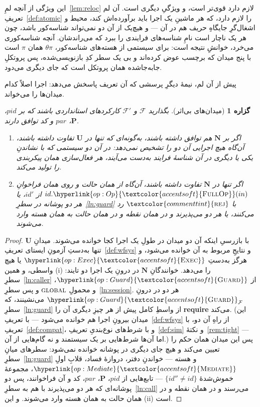 \documentclass[10pt,oneside,openany]{book}
\newcommand{\Ps}{\mathbf{P}}
\newcommand{\PID}{\mathit{pid}}
\newcommand{\admits}{\mathbf{N}}
\newcommand{\pars}{\mathit{par}}
\newcommand{\uses}{\mathbf{U}}
\newcommand{\F}{\mathcal{F}}
\newcommand{\op}[1]{\textnormal{\textsc{#1}}}
\newcommand{\opl}[1]{\hyperlink{op:#1}{\textcolor{accentsoft}{\op{#1}}}}
\newcommand{\fopl}[1]{\hyperlink{op:#1}{\textcolor{accentsoft}{\op{Full}\op{#1}}}}
\newcommand{\id}{id}
\newcommand{\atom}[1]{\textcolor{commenttint}{\op{#1}}}
\newcommand{\rej}{\atom{rej}}
\theoremstyle{accentdef}
\theoremstyle{accentplain}
\newtheorem{proposition}[definition]{گزاره}
\begin{document}
این ویژگی از آنچه لمِ~\ref{lem:reloc} لازم دارد قوی‌تر است، و ویژگیِ
دیگری است. آن لم تعریفِ~\ref{def:atomic} را لازم دارد، که هر ماشینِ یک اجرا
باید برآورده‌اش کند، محیط و اشغال‌گرِ جایگاهِ حریف هم در آن --- و هیچ‌یک از
آن دو نمی‌تواند شناسه‌کور باشد، چون هر یک ناچار است نامِ شناسه‌های فرایندی را
ببرد که می‌راندشان. آنچه شناسه‌کوری می‌خرد، خوانشِ نتیجه است: برای سیستمی
از هسته‌های شناسه‌کور، $\theta\pi$ همان $\pi$ است با پنج میدان که برچسب
عوض کرده‌اند و بی یک سطر کدِ بازنویسی‌شده، پس پروتکلِ جابه‌جا‌شده همان
پروتکل است که جای دیگری می‌دود.

پیش از آن لم، نیمهٔ دیگرِ پرسشی که آن تعریف پاسخش می‌دهد: اجرا اصلاً کدام
میدان‌ها را می‌خواند.

\begin{proposition}[میدان‌های بی‌اثر]\label{prop:inert}
بگذارید $\F$ و $\F'$ کارکردهای استانداردی باشند که بر $\PID$، $\Ps$،
$\pars$ و کد توافق دارند.
\begin{enumerate}[label=(\roman*),leftmargin=2.2em]
  \item اگر بر $\admits$ هم توافق داشته باشند، به‌گونه‌ای که تنها در $\uses$ تفاوت
        داشته باشند، آن‌گاه هیچ اجرایی آن دو را تشخیص نمی‌دهد: در آن دو سیستمی که با
        نشاندنِ یکی یا دیگری در آن شناسهٔ فرایند به‌دست می‌آیند، هر فعال‌سازی همان
        پیکربندی را تولید می‌کند.
  \item اگر تنها در $\admits$ تفاوت داشته باشند، آن‌گاه از همان حالت و روی همان
        فراخوانِ $\id.\fopl{Op}(in)$ از $\id'$، یا هر دو پوشانه در سطرِ~\ref{ln:guard}
        با $\rej$ رد می‌کنند، یا هر دو می‌پذیرند و در همان نقطه و در همان حالت به همان
        هسته وارد می‌شوند.
\end{enumerate}
\end{proposition}

\begin{proof}
با بازرسیِ اینکه آن دو میدان در طولِ یک اجرا کجا خوانده می‌شوند. میدانِ
$\uses$ تنها به‌دستِ آزمونِ ایستای تعریفِ~\ref{def:wfsys} و نتایجِ مربوط به
آن خوانده می‌شود، و هرگز به‌دستِ $\opl{Exec}$ یا هیچ واسطی، و همین (i) را
می‌دهد. خوانندگانِ $\admits$ در درونِ یک اجرا دو تایند:
سطرِ~\ref{ln:caller} از $\opl{Guard}$، و محمولِ $\op{global}$ و پس
سطرِ~\ref{ln:session}. هر دو در درونِ $\opl{Guard}_{\F}$ می‌نشینند، که
سطرِ~\ref{ln:guard} از واسطِ کامل پیش از هر چیزِ دیگری آن را
\textbf{require} می‌کند. (این میدان بیرونِ اجرا هم خوانده می‌شود --- با
تعریفِ~\ref{def:wfsys} از راهِ آن دو، با تعریفِ~\ref{def:compat}، و با
شرط‌های نوع‌بندیِ تعریفِ~\ref{def:sim} و نکتهٔ~\ref{rem:tight} --- اما آن‌ها
شرط‌هایی بر یک سیستمند و نه گام‌هایی از آن.) پس این میدان همان حکم را تعیین
می‌کند و هیچ جای دیگری در پوشانه خوانده نمی‌شود: سطرهای میانِ
سطرِ~\ref{ln:guard} و هسته --- خواندنِ دفتر، دروازهٔ فساد، قلابِ اولِ
$\opl{Mediate}$، مجموعهٔ خموش‌شدهٔ $\{\id'' \neq \id\}$ --- تابع‌هایی از
$\PID$، $\Ps$، $\pars$، کد و آن فراخوانند، پس دو پوشانه‌ای که هر دو
می‌پذیرند با هم به سطرِ~\ref{ln:call} می‌رسند و در همان نقطه و در همان
حالت به همان هسته وارد می‌شوند. و این (ii) است.
\end{proof}
\end{document}
